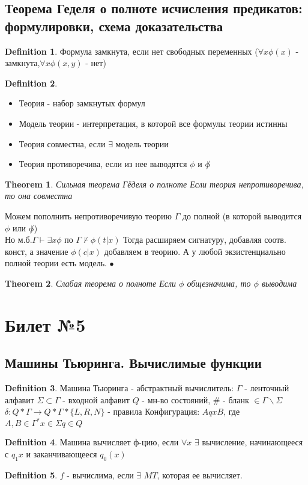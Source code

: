 \documentclass[a4paper]{article}
\theoremstyle{plain}
\newtheorem{theorem}{Theorem}
\theoremstyle{remark}
\theoremstyle{definition}
\newtheorem{definition}{Definition}
\renewenvironment{proof}{{\bfseries Proof}}{$\bullet$}
\begin{document}
\subsection{Теорема Геделя о полноте исчисления предикатов: формулировки, схема доказательства}
\begin{definition}
Формула замкнута, если нет свободных переменных ($\forall x \phi(x)$ - замкнута,$\forall x \phi(x,y)$ - нет)	
\end{definition}
\begin{definition}
	\begin{itemize}
		\item Теория - набор замкнутых формул
		\item Модель теории - интерпретация, в которой все формулы теории истинны
		\item Теория совместна, если $\exists$ модель теории 
		\item Теория противоречива, если из нее выводятся $\phi$ и $\not\phi$ 
	\end{itemize}	
\end{definition}

\begin{theorem}{Сильная теорема Гёделя о полноте}
Если теория непротиворечива, то она совместна	
\end{theorem}
\begin{proof}{Схема д-ва}
Можем пополнить непротиворечивую теорию $\Gamma$ до полной (в которой выводится $\phi$ или $\not\phi$)\\
Но м.б.$\Gamma \vdash \exists x\phi$ по $\Gamma \nvdash \phi(t|x)$
Тогда расширяем сигнатуру, добавляя соотв. конст, а значение $\phi(c|x)$ добавляем в теорию. А у любой экзистенциально полной теории есть модель.	
\end{proof}
\begin{theorem}{Слабая теорема о полноте}
Если $\phi$ общезначима, то $\phi$ выводима	
\end{theorem}
\section{Билет №5}
\subsection{Машины Тьюринга. Вычислимые функции}
\begin{definition}
Машина Тьюринга - абстрактный вычислитель:
$\Gamma$ - ленточный алфавит $\Sigma\subset\Gamma$ - входной алфавит
$Q$ - мн-во состояний, # - бланк $\in \Gamma\backslash\Sigma$
$\delta: Q*\Gamma\rightarrow Q*\Gamma*\{L,R,N\}$ - правила
Конфигурация: $AqxB$, где $A,B \in \Gamma^* x\in\Sigma q\in Q$ 	
\end{definition}
\begin{definition}
Машина вычисляет ф-цию, если $\forall x$ $\exists$ вычисление, начинающееся с $q_1x$ и заканчивающееся $q_0(x)$	
\end{definition}
\begin{definition}
$f$ - вычислима, если $\exists$ $MT$, которая ее вычисляет.	
\end{definition}
\end{document}
